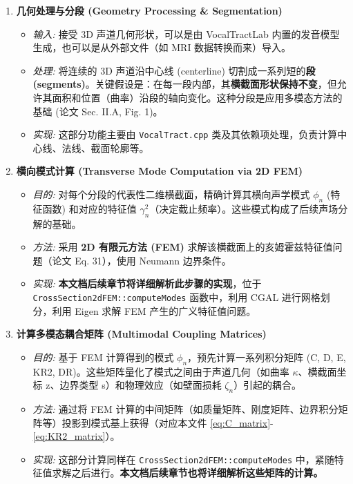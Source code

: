 \documentclass{ctexart}
\begin{document}
\begin{enumerate}
    \item \textbf{几何处理与分段 (Geometry Processing \& Segmentation)}
        \begin{itemize}
            \item \textit{输入:} 接受 3D 声道几何形状，可以是由 VocalTractLab 内置的发音模型生成，也可以是从外部文件（如 MRI 数据转换而来）导入。
            \item \textit{处理:} 将连续的 3D 声道沿中心线 (centerline) 切割成一系列短的\textbf{段 (segments)}。关键假设是：在每一段内部，其\textbf{横截面形状保持不变}，但允许其面积和位置（曲率）沿段的轴向变化。这种分段是应用多模态方法的基础 (论文 Sec. II.A, Fig. 1)。
            \item \textit{实现:} 这部分功能主要由 \texttt{VocalTract.cpp} 类及其依赖项处理，负责计算中心线、法线、截面轮廓等。
        \end{itemize}

    \item \textbf{横向模式计算 (Transverse Mode Computation via 2D FEM)}
        \begin{itemize}
            \item \textit{目的:} 对每个分段的代表性二维横截面，精确计算其横向声学模式 $\phi_n$ (特征函数) 和对应的特征值 $\gamma_n^2$（决定截止频率）。这些模式构成了后续声场分解的基础。
            \item \textit{方法:} 采用 \textbf{2D 有限元方法 (FEM)} 求解该横截面上的亥姆霍兹特征值问题（论文 Eq. 31），使用 Neumann 边界条件。
            \item \textit{实现:} \textbf{本文档后续章节将详细解析此步骤的实现}，位于 \texttt{CrossSection2dFEM::computeModes} 函数中，利用 CGAL 进行网格划分，利用 Eigen 求解 FEM 产生的广义特征值问题。
        \end{itemize}

    \item \textbf{计算多模态耦合矩阵 (Multimodal Coupling Matrices)}
        \begin{itemize}
            \item \textit{目的:} 基于 FEM 计算得到的模式 $\phi_n$，预先计算一系列积分矩阵 (C, D, E, KR2, DR)。这些矩阵量化了模式之间由于声道几何（如曲率 $\kappa$、横截面坐标 z、边界类型 s）和物理效应（如壁面损耗 $\zeta_n$）引起的耦合。
            \item \textit{方法:} 通过将 FEM 计算的中间矩阵（如质量矩阵、刚度矩阵、边界积分矩阵等）投影到模式基上获得（对应本文件 \eqref{eq:C_matrix}-\eqref{eq:KR2_matrix}）。
            \item \textit{实现:} 这部分计算同样在 \texttt{CrossSection2dFEM::computeModes} 中，紧随特征值求解之后进行。\textbf{本文档后续章节也将详细解析这些矩阵的计算。}
        \end{itemize}


\end{enumerate}
\end{document}
